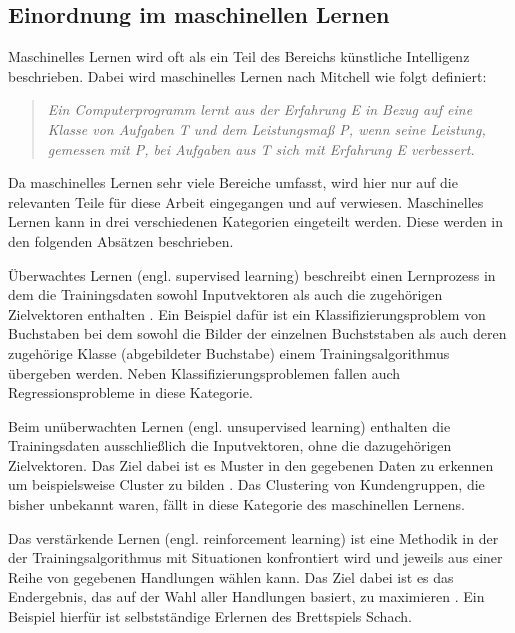 \subsection{Einordnung im maschinellen Lernen}
\label{grundlagen_nn_ml}

Maschinelles Lernen wird oft als ein Teil des Bereichs künstliche Intelligenz beschrieben. Dabei wird maschinelles Lernen nach Mitchell \cite{mitchell1997machine} wie folgt definiert:

\begin{quote}
\textit{\glqq Ein Computerprogramm lernt aus der Erfahrung E in Bezug auf eine Klasse von Aufgaben T und dem Leistungsmaß P, wenn seine Leistung, gemessen mit P, bei Aufgaben aus T sich mit Erfahrung E verbessert.\grqq}
\end{quote}

Da maschinelles Lernen sehr viele Bereiche umfasst, wird hier nur auf die relevanten Teile für diese Arbeit eingegangen und auf \cite{mitchell1997machine} verwiesen. Maschinelles Lernen kann in drei verschiedenen Kategorien eingeteilt werden. Diese werden in den folgenden Absätzen beschrieben.

Überwachtes Lernen (engl. supervised learning) beschreibt einen Lernprozess in dem die Trainingsdaten sowohl Inputvektoren als auch die zugehörigen Zielvektoren enthalten \cite{bishop2006pattern}. Ein Beispiel dafür ist ein Klassifizierungsproblem von Buchstaben bei dem sowohl die Bilder der einzelnen Buchststaben als auch deren zugehörige Klasse (abgebildeter Buchstabe) einem Trainingsalgorithmus übergeben werden. Neben Klassifizierungsproblemen fallen auch Regressionsprobleme in diese Kategorie.

Beim unüberwachten Lernen (engl. unsupervised learning) enthalten die Trainingsdaten ausschließlich die Inputvektoren, ohne die dazugehörigen Zielvektoren. Das Ziel dabei ist es Muster in den gegebenen Daten zu erkennen um beispielsweise Cluster zu bilden \cite{bishop2006pattern}. Das Clustering von Kundengruppen, die bisher unbekannt waren, fällt in diese Kategorie des maschinellen Lernens.

Das verstärkende Lernen (engl. reinforcement learning) ist eine Methodik in der der Trainingsalgorithmus mit Situationen konfrontiert wird und jeweils aus einer Reihe von gegebenen Handlungen wählen kann. Das Ziel dabei ist es das Endergebnis, das auf der Wahl aller Handlungen basiert, zu maximieren \cite{sutton1998introduction}. Ein Beispiel hierfür ist selbstständige Erlernen des Brettspiels Schach.


